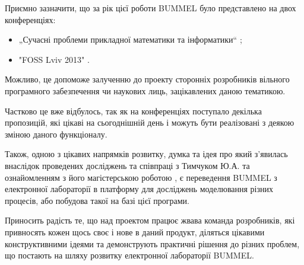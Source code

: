 \documentclass[12pt,a4paper]{article}
\begin{document}
Приємно зазначити, що за рік цієї роботи BUMMEL було представлено на двох конференціях:
\begin{itemize}
  \item „Сучасні проблеми прикладної математики та інформатики“ \cite{thesis-MPoAMaCS};
  \item "FOSS Lviv 2013" \cite{thesis-foss2013}.
\end{itemize}
Можливо, це допоможе залученню до проекту сторонніх розробників вільного програмного забезпечення чи наукових лиць, зацікавлених даною тематикою.

Частково це вже відбулось, так як на конференціях поступало декілька пропозицій, які цікаві на сьогоднішній день і можуть бути реалізовані з деякою зміною даного функціоналу.

Також, одною з цікавих напрямків розвитку, думка та ідея про який з’явилась внаслідок проведених досліджень та співпраці з Тимчуком Ю.А. та ознайомленням з його магістерською роботою \cite{thesis-Tymchuk}, є переведення BUMMEL з електронної лабораторії в платформу для досліджень моделювання різних процесів, або побудова такої на базі цієї програми.

Приносить радість те, що над проектом працює жвава команда розробників, які привносять кожен щось своє і нове в даний продукт, діляться цікавими конструктивними ідеями та демонструють практичні рішення до різних проблем, що постають на шляху розвитку електронної лабораторії BUMMEL.

\clearpage
\end{document}
